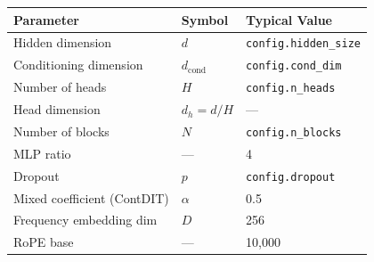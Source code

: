 \documentclass[11pt,a4paper]{article}
\begin{document}
\begin{center}
\begin{tabular}{@{}lll@{}}
\toprule
\textbf{Parameter} & \textbf{Symbol} & \textbf{Typical Value} \\
\midrule
Hidden dimension & $d$ & \texttt{config.hidden\_size} \\
Conditioning dimension & $d_{\text{cond}}$ & \texttt{config.cond\_dim} \\
Number of heads & $H$ & \texttt{config.n\_heads} \\
Head dimension & $d_h = d/H$ & --- \\
Number of blocks & $N$ & \texttt{config.n\_blocks} \\
MLP ratio & --- & 4 \\
Dropout & $p$ & \texttt{config.dropout} \\
Mixed coefficient (ContDIT) & $\alpha$ & 0.5 \\
Frequency embedding dim & $D$ & 256 \\
RoPE base & --- & 10{,}000 \\
\bottomrule
\end{tabular}
\end{center}
\end{document}
